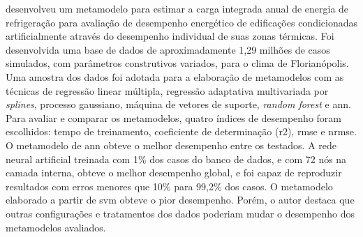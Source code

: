  desenvolveu um metamodelo para estimar a carga integrada anual de energia de refrigeração para avaliação de desempenho energético de edificações condicionadas artificialmente através do desempenho individual de suas zonas térmicas. Foi desenvolvida uma base de dados de aproximadamente 1,29 milhões de casos simulados, com parâmetros construtivos variados, para o clima de Florianópolis. Uma amostra dos dados foi adotada para a elaboração de metamodelos com as técnicas de regressão linear múltipla, regressão adaptativa multivariada por \textit{splines}, processo gaussiano, máquina de vetores de suporte, \textit{random forest} e \acrlong{ann}. Para avaliar e comparar os metamodelos, quatro índices de desempenho foram escolhidos: tempo de treinamento, coeficiente de determinação (\acrshort{r2}), \acrshort{rmse} e \acrfull{nrmse}. O metamodelo de \acrshort{ann} obteve o melhor desempenho entre os testados. A rede neural artificial treinada com 1\% dos casos do banco de dados, e com 72 nós na camada interna, obteve o melhor desempenho global, e foi capaz de reproduzir resultados com erros menores que 10\% para 99,2\% dos casos. O metamodelo elaborado a partir de \acrshort{svm} obteve o pior desempenho. Porém, o autor destaca que outras configurações e tratamentos dos dados poderiam mudar o desempenho dos metamodelos avaliados.
%
%
%
%
